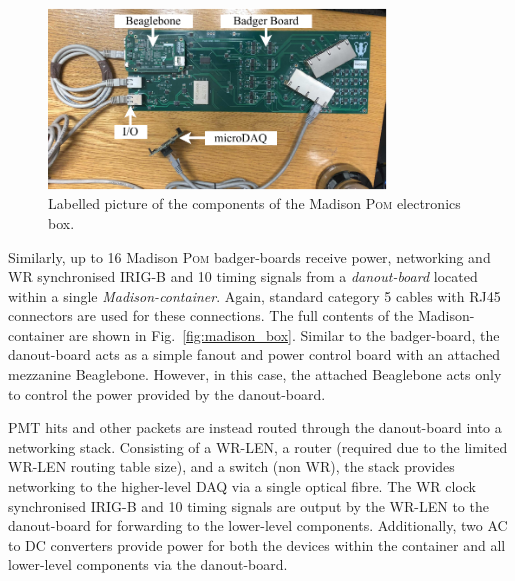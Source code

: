 \begin{figure} %
    \includegraphics[width=0.8\textwidth]{diagrams/5-daq/madison_plane.pdf}
    \caption[Labelled picture of the components of the Madison \textsc{Pom} electronics box.]
    {Labelled picture of the components of the Madison \textsc{Pom} electronics box.}
    \label{fig:madison_plane}
\end{figure}

Similarly, up to 16 Madison \textsc{Pom} badger-boards receive power, networking and WR
synchronised IRIG-B and \unit{10}{} timing signals from a \emph{danout-board} located
within a single \emph{Madison-container}. Again, standard category 5 cables with RJ45 connectors
are used for these connections. The full contents of the Madison-container are shown in
Fig.~\ref{fig:madison_box}. Similar to the badger-board, the danout-board acts as a simple fanout
and power control board with an attached mezzanine Beaglebone. However, in this case, the attached
Beaglebone acts only to control the power provided by the danout-board.

PMT hits and other packets are instead routed through the danout-board into a networking stack.
Consisting of a WR-LEN, a router (required due to the limited WR-LEN routing table size), and a
switch (non WR), the stack provides networking to the higher-level DAQ via a single optical fibre.
The WR clock synchronised IRIG-B and \unit{10}{} timing signals are output by the WR-LEN
to the danout-board for forwarding to the lower-level components. Additionally, two AC to DC
converters provide power for both the devices within the container and all lower-level components
via the danout-board.

